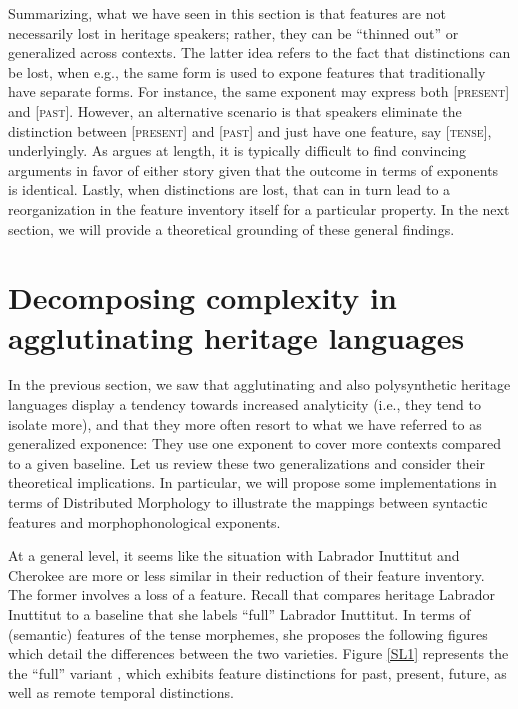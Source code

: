 \documentclass[output=paper,colorlinks,citecolor=brown,footheight=42pt]{langscibook}
\begin{document}
Summarizing, what we have seen in this section is that features are not necessarily lost in heritage speakers; rather, they can be “thinned out” or generalized across contexts. The latter idea refers to the fact that distinctions can be lost, when e.g., the same form is used to expone features that traditionally have separate forms. For instance, the same exponent may express both [\textsc{present}] and [\textsc{past}]. However, an alternative scenario is that speakers eliminate the distinction between [\textsc{present}] and [\textsc{past}] and just have one feature, say [\textsc{tense}], underlyingly. As \citet{riksem2017} argues at length, it is typically difficult to find convincing arguments in favor of either story given that the outcome in terms of exponents is identical. Lastly, when distinctions are lost, that can in turn lead to a reorganization in the feature inventory itself for a particular property. In the next section, we will provide a theoretical grounding of these general findings.

\section{Decomposing complexity in agglutinating heritage languages}\label{decompose}
In the previous section, we saw that agglutinating and also polysynthetic heritage languages display a tendency towards increased analyticity (i.e., they tend to isolate more), and that they more often resort to what we have referred to as generalized exponence: They use one exponent to cover more contexts compared to a given baseline. Let us review these two generalizations and consider their theoretical implications. In particular, we will propose some implementations in terms of Distributed Morphology to illustrate the mappings between syntactic features and morphophonological exponents.

At a general level, it seems like the situation with Labrador Inuttitut and Cherokee are more or less similar in their reduction of their feature inventory. The former involves a loss of a feature. Recall that \citet{sherkinalieber2015} compares heritage Labrador Inuttitut to a baseline that she labels “full” Labrador Inuttitut. In terms of (semantic) features of the tense morphemes, she proposes the following figures which detail the differences between the two varieties. Figure \ref{SL1} represents the the “full” variant \citep[44]{sherkinalieber2015}, which exhibits feature distinctions for past, present, future, as well as remote temporal distinctions.
\end{document}
